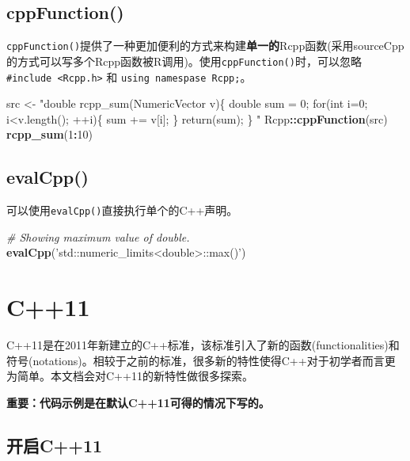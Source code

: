 \documentclass[]{ctexbook}
\newenvironment{Shaded}{\begin{snugshade}}{\end{snugshade}}
\newcommand{\KeywordTok}[1]{\textcolor[rgb]{0.13,0.29,0.53}{\textbf{#1}}}
\newcommand{\DecValTok}[1]{\textcolor[rgb]{0.00,0.00,0.81}{#1}}
\newcommand{\StringTok}[1]{\textcolor[rgb]{0.31,0.60,0.02}{#1}}
\newcommand{\CommentTok}[1]{\textcolor[rgb]{0.56,0.35,0.01}{\textit{#1}}}
\newcommand{\OperatorTok}[1]{\textcolor[rgb]{0.81,0.36,0.00}{\textbf{#1}}}
\newcommand{\NormalTok}[1]{#1}
\begin{document}
\section{cppFunction()}\label{cppFunction}

\texttt{cppFunction()}提供了一种更加便利的方式来构建\textbf{单一的}Rcpp函数(采用sourceCpp的方式可以写多个Rcpp函数被R调用)。使用\texttt{cppFunction()}时，可以忽略\texttt{\#include\ \textless{}Rcpp.h\textgreater{}}
和 \texttt{using\ namespase\ Rcpp;}。

\begin{Shaded}
\begin{Highlighting}[]
\NormalTok{src <-}
\StringTok{  "double rcpp_sum(NumericVector v)\{}
\StringTok{    double sum = 0;}
\StringTok{    for(int i=0; i<v.length(); ++i)\{}
\StringTok{      sum += v[i];}
\StringTok{    \}}
\StringTok{    return(sum);}
\StringTok{  \}}
\StringTok{  "}
\NormalTok{Rcpp}\OperatorTok{::}\KeywordTok{cppFunction}\NormalTok{(src)}
\KeywordTok{rcpp_sum}\NormalTok{(}\DecValTok{1}\OperatorTok{:}\DecValTok{10}\NormalTok{)}
\end{Highlighting}
\end{Shaded}

\section{evalCpp()}\label{evalcpp}

可以使用\texttt{evalCpp()}直接执行单个的C++声明。

\begin{Shaded}
\begin{Highlighting}[]
\CommentTok{# Showing maximum value of double.}
\KeywordTok{evalCpp}\NormalTok{(}\StringTok{'std::numeric_limits<double>::max()'}\NormalTok{)}
\end{Highlighting}
\end{Shaded}

\chapter{C++11}\label{cpp11}

C++11是在2011年新建立的C++标准，该标准引入了新的函数(functionalities)和符号(notations)。相较于之前的标准，很多新的特性使得C++对于初学者而言更为简单。本文档会对C++11的新特性做很多探索。

\textbf{重要：代码示例是在默认C++11可得的情况下写的。}

\section{开启C++11}\label{enable}
\end{document}
